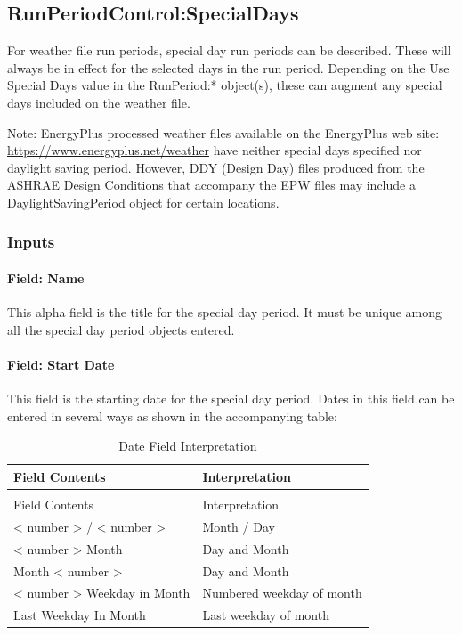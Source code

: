 \subsection{RunPeriodControl:SpecialDays}\label{runperiodcontrolspecialdays}

For weather file run periods, special day run periods can be described. These will always be in effect for the selected days in the run period. Depending on the Use Special Days value in the RunPeriod:* object(s), these can augment any special days included on the weather file.

\begin{callout}
Note: EnergyPlus processed weather files available on the EnergyPlus web site: \url{https://www.energyplus.net/weather} have neither special days specified nor daylight saving period. However, DDY (Design Day) files produced from the ASHRAE Design Conditions that accompany the EPW files may include a DaylightSavingPeriod object for certain locations.
\end{callout}

\subsubsection{Inputs}\label{inputs-6-013}

\paragraph{Field: Name}\label{field-name-6-010}

This alpha field is the title for the special day period. It must be unique among all the special day period objects entered.

\paragraph{Field: Start Date}\label{field-start-date}

This field is the starting date for the special day period. Dates in this field can be entered in several ways as shown in the accompanying table:

\begin{longtable}[c]{@{}ll@{}}
\caption{Date Field Interpretation \label{table:date-field-interpretation}} \tabularnewline
\toprule
Field Contents & Interpretation \tabularnewline
\midrule
\endfirsthead

\caption[]{Date Field Interpretation} \tabularnewline
\toprule
Field Contents & Interpretation \tabularnewline
\midrule
\endhead

< number >  /  < number > & Month / Day \tabularnewline
< number >  Month & Day and Month \tabularnewline
Month  < number > & Day and Month \tabularnewline
< number >  Weekday in Month & Numbered weekday of month \tabularnewline
Last Weekday In Month & Last weekday of month \tabularnewline
\bottomrule
\end{longtable}

